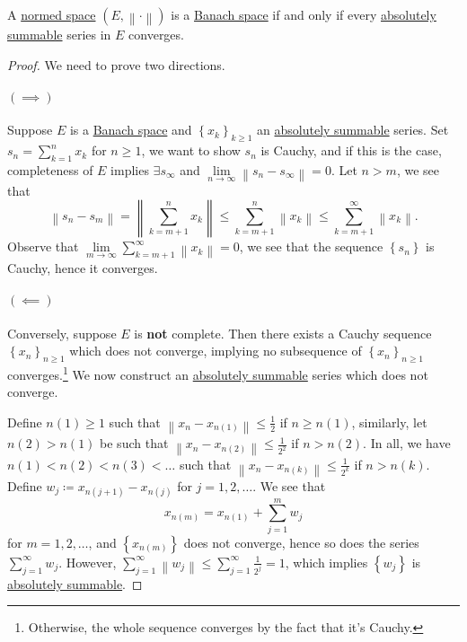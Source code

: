 \begin{theorem}\label{thm:criterion-for-completeness}
	A \hyperref[def:normed-vector-space]{normed space} \(( E, \left\lVert \cdot\right\rVert )\) is a \hyperref[def:Banach-space]{Banach space} if and only if every \hyperref[def:absolutely-summable]{absolutely summable} series in \(E\) converges.
\end{theorem}
\begin{proof}
	We need to prove two directions.

	\paragraph{\((\implies )\)}
	Suppose \(E\) is a \hyperref[def:Banach-space]{Banach space} and \(\left\{ x_{k} \right\}_{k \geq 1}\) an \hyperref[def:absolutely-summable]{absolutely summable} series. Set \(s_n = \sum_{k=1}^{n} x_{k} \) for \(n \geq 1\), we want to show \(s_n\) is Cauchy, and if this is the case, completeness of \(E\) implies \(\exists s_{\infty }\) and \(\lim\limits_{n \to \infty} \left\lVert s_n - s_{\infty }\right\rVert = 0\). Let \(n > m\), we see that
	\[
		\left\lVert s_n - s_m\right\rVert = \left\lVert \sum_{k=m+1}^{n} x_k\right\rVert \leq \sum_{k=m+1}^{n} \left\lVert x_k\right\rVert \leq \sum_{k=m+1}^{\infty} \left\lVert x_k\right\rVert.
	\]
	Observe that \(\lim\limits_{m \to \infty} \sum\limits_{k=m+1}^{\infty} \left\lVert x_k\right\rVert = 0\), we see that the sequence \(\left\{ s_n \right\} \) is Cauchy, hence it converges.

	\paragraph{\((\impliedby)\)}
	Conversely, suppose \(E\) is \textbf{not} complete. Then there exists a Cauchy sequence \(\left\{ x_n \right\}_{ n \geq 1} \) which does not converge, implying no subsequence of \(\left\{ x_n \right\}_{n \geq 1} \) converges.\footnote{Otherwise, the whole sequence converges by the fact that it's Cauchy.} We now construct an \hyperref[def:absolutely-summable]{absolutely summable} series which does not converge.

	Define \(n(1) \geq 1\) such that \(\left\lVert x_n - x_{n(1)}\right\rVert \leq \frac{1}{2}\) if \(n \geq n(1)\), similarly, let \(n(2) > n(1)\) be such that \(\left\lVert x_n - x_{n(2)}\right\rVert \leq \frac{1}{2^2}\) if \( n > n(2)\). In all, we have \(n(1) < n(2) < n(3) < \ldots  \) such that \(\left\lVert x_n - x_{n(k)}\right\rVert \leq \frac{1}{2^k}\) if \(n > n(k)\). Define \(w_j \coloneqq x_{n(j+1)} - x_{n(j)}\) for \(j = 1, 2, \ldots  \). We see that
	\[
		x_{n(m)} = x_{n(1)} + \sum_{j=1}^{m} w_j
	\]
	for \(m = 1, 2, \ldots\), and \(\left\{ x_{n(m)} \right\} \) does not converge, hence so does the series \(\sum_{j=1}^{\infty} w_j\). However, \(\sum_{j=1}^{\infty} \left\lVert w_j\right\rVert \leq \sum_{j=1}^{\infty} \frac{1}{2^j} = 1\), which implies \(\left\{ w_j \right\} \) is \hyperref[def:absolutely-summable]{absolutely summable}.
\end{proof}

